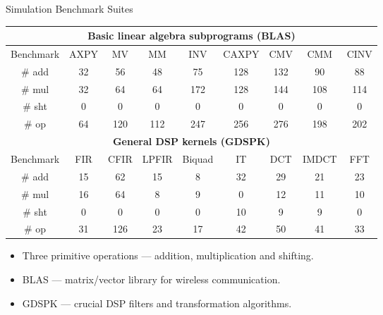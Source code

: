 \documentclass{beamer}
\begin{document}
\begin{CJK}{UTF8}{bkai}
            \begin{frame}{Simulation Benchmark Suites}
                \begin{table}[!ht]
                    \centering
                    \resizebox{\columnwidth}{!}
                    {
                        \begin{tabular}{|c|c|c|c|c|c|c|c|c|}
                            \hline
                            \multicolumn{9}{|c|}{\textbf{Basic linear algebra subprograms (BLAS)}} \\ \hline
                            Benchmark              & AXPY   & MV     & MM      & INV      & CAXPY  & CMV  & CMM    & CINV  \\ \hline
                            \# add            &  32    &  56    &   48    &    75    &  128   & 132  &   90   &  88   \\ \hline
                            \# mul            &  32    &  64    &   64    &   172    &  128   & 144  &  108   & 114   \\ \hline
                            \# sht            &   0    &   0    &    0    &     0    &    0   &   0  &    0   &   0   \\ \hline
                            \# op             &  64    & 120    &  112    &   247    &  256   & 276  &  198   & 202   \\ \hline
                            \multicolumn{9}{|c|}{\textbf{General DSP kernels (GDSPK)}}                     \\ \hline
                            Benchmark              & FIR    & CFIR   & LPFIR   & Biquad   & IT     & DCT  & IMDCT  & FFT   \\ \hline
                            \# add            & 15     &  62    &   15    &    8     &  32    &  29  &   21   &  23   \\ \hline
                            \# mul            & 16     &  64    &    8    &    9     &   0    &  12  &   11   &  10   \\ \hline
                            \# sht            &  0     &   0    &    0    &    0     &  10    &   9  &    9   &   0   \\ \hline
                            \# op             & 31     & 126    &   23    &   17     &  42    &  50  &   41   &  33   \\ \hline
                        \end{tabular}
                    }
                \end{table}
                \begin{itemize}
                    \pause
                    \item Three primitive operations --- addition, multiplication and shifting.
                    \pause
                    \item BLAS --- matrix/vector library for wireless communication.
                    \pause
                    \item GDSPK --- crucial DSP filters and transformation algorithms.
                \end{itemize}
            \end{frame}


\end{CJK}
\end{document}
